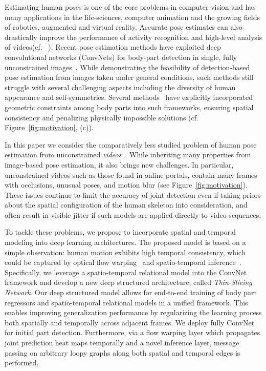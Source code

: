 \documentclass[10pt,twocolumn,letterpaper]{article}
\newcommand{\figref}[1]{Figure~\ref{#1}}
\begin{document}
Estimating human poses is one of the core problems in computer vision and has many applications in the life-sciences, computer animation and the growing fields of robotics, augmented and virtual reality. Accurate pose estimates can also drastically improve the performance
of activity recognition and high-level analysis of videos(cf. ~\cite{Jhuang:ICCV:2013,wang2014video,xiaohan2015joint}). Recent pose estimation methods have exploited deep convolutional networks (ConvNets) for body-part detection in single, fully unconstrained images~\cite{chen2014articulated,newell2016stacked,ouyang2014multi,pishchulin2015deepcut,tompson2014joint,toshev2014deeppose,wei2016cpm}. While demonstrating the feasibility of detection-based pose estimation from images taken under general conditions, such methods still struggle with several challenging aspects including the diversity of human appearance and self-symmetries. Several methods~\cite{chen2014articulated,yang2016end} have explicitly incorporated geometric constraints among body parts into such frameworks, ensuring spatial consistency and penalizing physically impossible solutions (cf. \figref{fig:motivation}, (c)).

In this paper we consider the comparatively less studied problem of human pose estimation from unconstrained \emph{videos}~\cite{gkioxari2016chained,pfister2015flowing,zhang2015human,zuffi2013estimating}. While inheriting many properties from image-based pose estimation, it also brings new challenges. In particular, unconstrained videos such as those found in online portals, contain many frames with occlusions, unusual poses, and motion blur (see \figref{fig:motivation}). These issues continue to limit the accuracy of joint detection even if taking priors about the spatial configuration of the human skeleton into consideration, and often result in visible jitter if such models are applied directly to video sequences.

To tackle these problems, we propose to incorporate spatial and temporal modeling into deep learning architectures.
The proposed model is based on a simple observation: human motion exhibits high temporal consistency, which could be captured by optical flow warping~\cite{pfister2015flowing,zhang2015human,zuffi2013estimating} and spatio-temporal inference~\cite{wang2014video,xiaohan2015joint}. Specifically, we leverage a spatio-temporal relational model into the ConvNet framework and develop a new deep structured architecture, called {\em Thin-Slicing Network}.
Our deep structured model allows for end-to-end training of body part regressors and spatio-temporal relational models in a unified framework. This enables improving generalization performance by regularizing the learning process both spatially and temporally across adjacent frames.
We deploy fully ConvNet for initial part detection. Furthermore, via a flow warping layer which propagates joint prediction heat
maps temporally and a novel inference layer, message passing
on arbitrary loopy graphs along both spatial and temporal
edges is performed.
\end{document}
